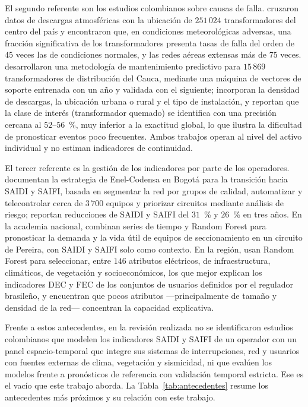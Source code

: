 El segundo referente son los estudios colombianos sobre causas de falla. \textcite{aranguren2015} cruzaron datos de descargas atmosféricas con la ubicación de $251\,024$ transformadores del centro del país y encontraron que, en condiciones meteorológicas adversas, una fracción significativa de los transformadores presenta tasas de falla del orden de $45$ veces las de condiciones normales, y las redes aéreas extensas más de $75$ veces. \textcite{alvarez2022} desarrollaron una metodología de mantenimiento predictivo para $15\,869$ transformadores de distribución del Cauca, mediante una máquina de vectores de soporte entrenada con un año y validada con el siguiente; incorporan la densidad de descargas, la ubicación urbana o rural y el tipo de instalación, y reportan que la clase de interés (transformador quemado) se identifica con una precisión cercana al $52$--$56$~\%, muy inferior a la exactitud global, lo que ilustra la dificultad de pronosticar eventos poco frecuentes. Ambos trabajos operan al nivel del activo individual y no estiman indicadores de continuidad.

El tercer referente es la gestión de los indicadores por parte de los operadores. \textcite{gomez2017} documentan la estrategia de Enel-Codensa en Bogotá para la transición hacia SAIDI y SAIFI, basada en segmentar la red por grupos de calidad, automatizar y telecontrolar cerca de $3\,700$ equipos y priorizar circuitos mediante análisis de riesgo; reportan reducciones de SAIDI y SAIFI del $31$~\% y $26$~\% en tres años. En la academia nacional, \textcite{velasquez2024} combinan series de tiempo y Random Forest para pronosticar la demanda y la vida útil de equipos de seccionamiento en un circuito de Pereira, con SAIDI y SAIFI solo como contexto. En la región, \textcite{dacosta2023} usan Random Forest para seleccionar, entre $146$ atributos eléctricos, de infraestructura, climáticos, de vegetación y socioeconómicos, los que mejor explican los indicadores DEC y FEC de los conjuntos de usuarios definidos por el regulador brasileño, y encuentran que pocos atributos ---principalmente de tamaño y densidad de la red--- concentran la capacidad explicativa.

Frente a estos antecedentes, en la revisión realizada no se identificaron estudios colombianos que modelen los indicadores SAIDI y SAIFI de un operador con un panel espacio-temporal que integre sus sistemas de interrupciones, red y usuarios con fuentes externas de clima, vegetación y sismicidad, ni que evalúen los modelos frente a pronósticos de referencia con validación temporal estricta. Ese es el vacío que este trabajo aborda. La Tabla~\ref{tab:antecedentes} resume los antecedentes más próximos y su relación con este trabajo.

